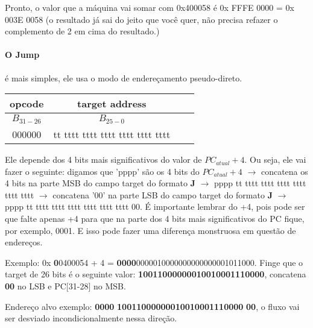 \documentclass{article}
\begin{document}
Pronto, o valor que a máquina vai somar com 0x400058 é 0x FFFE 0000 = 0x 003E 
0058 (o resultado já sai do jeito que você quer, não precisa refazer o 
complemento de 2 em cima do resultado.)

\paragraph{O Jump} é mais simples, ele usa o modo de endereçamento 
pseudo-direto.

\begin{table}[ht!]
  \begin{tabular}{|c|c|c|c|}
    \hline opcode & target address \\ 
    \hline $B_{31-26}$ & $B_{25-0}$ \\ 
    \hline 000000 & tt tttt tttt tttt tttt tttt tttt \\ 
    \hline
  \end{tabular}
\end{table}

Ele depende dos 4 bits mais significativos do valor de $PC_{atual} + 4$. Ou 
seja, ele vai fazer o seguinte: digamos que 'pppp' são os 4 bits do $PC_{atual} 
+ 4$ $\rightarrow$ concatena os 4 bits na parte MSB do campo target do formato
\textbf{J} $\rightarrow$ pppp tt tttt tttt tttt tttt tttt tttt $\rightarrow$
concatena '00' na parte LSB do campo target do formato \textbf{J} $\rightarrow$
pppp tt tttt tttt tttt tttt tttt tttt 00. É importante lembrar do +4, pois pode 
ser que falte apenas +4 para que na parte dos 4 bits mais significativos do PC 
fique, por exemplo, 0001. E isso pode fazer uma diferença monstruosa em questão 
de endereços.

Exemplo: 0x\textbf{\color{Red} 0}0400054 + 4 = \textbf{\color{Red} 
0000}0000010000000000000001011000. Finge que o target de 26 bits é o seguinte 
valor: \textbf{\color{Blue} 10011000000010010001110000}, concatena 
\textbf{\color{Green} 00} no LSB e PC[31-28] no MSB.

Endereço alvo exemplo: \textbf{\color{Red} 0000}\textbf{\color{Blue}
10011000000010010001110000}\textbf{\color{Green} 00}, o fluxo vai ser desviado
incondicionalmente nessa direção.
\end{document}

